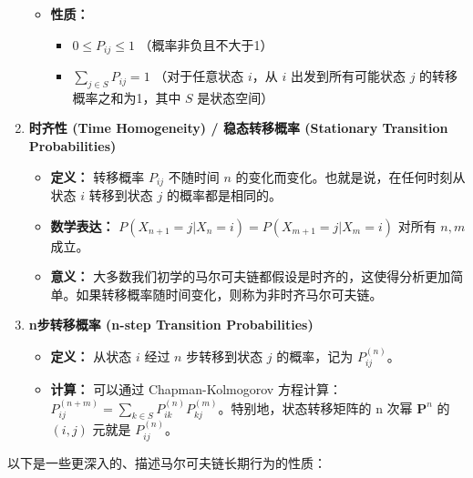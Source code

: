\begin{enumerate}
\begin{itemize}
		\item \textbf{性质：}
		\begin{itemize}
			\item $0 \le P_{ij} \le 1$ （概率非负且不大于1）
			\item $\sum_{j \in S} P_{ij} = 1$ （对于任意状态 $i$，从 $i$ 出发到所有可能状态 $j$ 的转移概率之和为1，其中 $S$ 是状态空间）
		\end{itemize}
	\end{itemize}
	\item \textbf{时齐性 (Time Homogeneity) / 稳态转移概率 (Stationary Transition Probabilities)}
	\begin{itemize}
		\item \textbf{定义：} 转移概率 $P_{ij}$ 不随时间 $n$ 的变化而变化。也就是说，在任何时刻从状态 $i$ 转移到状态 $j$ 的概率都是相同的。
		\item \textbf{数学表达：} $P(X_{n+1}=j | X_n=i) = P(X_{m+1}=j | X_m=i)$ 对所有 $n, m$ 成立。
		\item \textbf{意义：} 大多数我们初学的马尔可夫链都假设是时齐的，这使得分析更加简单。如果转移概率随时间变化，则称为非时齐马尔可夫链。
	\end{itemize}
	\item \textbf{n步转移概率 (n-step Transition Probabilities)}
	\begin{itemize}
		\item \textbf{定义：} 从状态 $i$ 经过 $n$ 步转移到状态 $j$ 的概率，记为 $P_{ij}^{(n)}$。
		\item \textbf{计算：} 可以通过 Chapman-Kolmogorov 方程计算：$P_{ij}^{(n+m)} = \sum_{k \in S} P_{ik}^{(n)} P_{kj}^{(m)}$。特别地，状态转移矩阵的 n 次幂 $\mathbf{P}^n$ 的 $(i,j)$ 元就是 $P_{ij}^{(n)}$。
	\end{itemize}
\end{enumerate}

以下是一些更深入的、描述马尔可夫链长期行为的性质：

